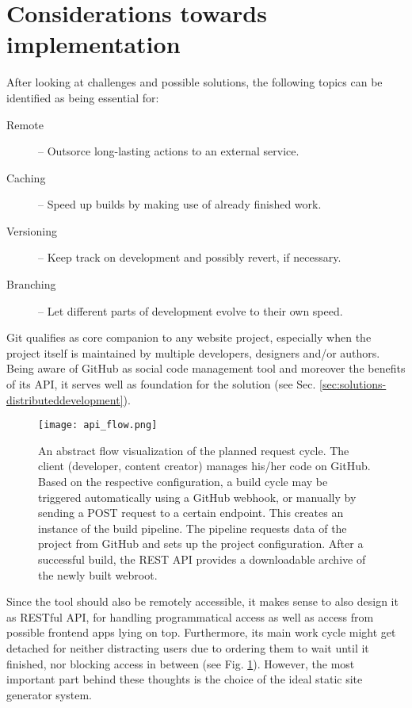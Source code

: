 \section{Considerations towards implementation}
\label{sec:primarythoughts}

After looking at challenges and possible solutions, the following topics can be identified as being essential for:

\begin{description}
  \item[Remote] -- Outsorce long-lasting actions to an external service.
  \item[Caching] -- Speed up builds by making use of already finished work.
  \item[Versioning] -- Keep track on development and possibly revert, if necessary.
  \item[Branching] -- Let different parts of development evolve to their own speed.
\end{description}

Git qualifies as core companion to any website project, especially when the project itself is maintained by multiple developers, designers and/or authors. Being aware of GitHub as social code management tool and moreover the benefits of its API, it serves well as foundation for the solution (see Sec. \ref{sec:solutions-distributeddevelopment}).

\begin{figure} %
    \centering
    \texttt{[image: api\_flow.png]}
    \caption{An abstract flow visualization of the planned request cycle. The client (developer, content creator) manages his/her code on GitHub. Based on the respective configuration, a build cycle may be triggered automatically using a GitHub webhook, or manually by sending a POST request to a certain endpoint. This creates an instance of the build pipeline. The pipeline requests data of the project from GitHub and sets up the project configuration. After a successful build, the REST API provides a downloadable archive of the newly built webroot.}
    \label{fig:api-flow}
\end{figure}
%

Since the tool should also be remotely accessible, it makes sense to also design it as RESTful API, for handling programmatical access as well as access from possible frontend apps lying on top. Furthermore, its main work cycle might get detached for neither distracting users due to ordering them to wait until it finished, nor blocking access in between (see Fig. \ref{fig:api-flow}).
However, the most important part behind these thoughts is the choice of the ideal static site generator system.


